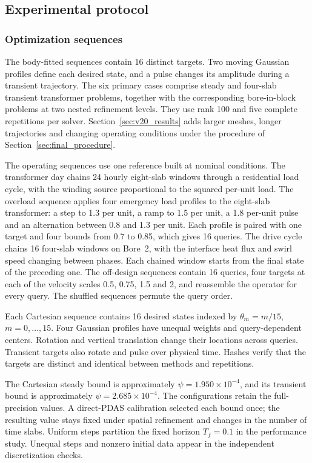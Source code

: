 \subsection{Experimental protocol}
\label{sec:benchmarks}

\subsubsection{Optimization sequences}
The body-fitted sequences contain 16 distinct targets. Two moving
Gaussian profiles define each desired state, and a pulse changes its
amplitude during a transient trajectory.
The six primary cases comprise steady and four-slab transient
transformer problems, together with the corresponding bore-in-block problems at
two nested refinement levels. They use rank 100 and five complete
repetitions per solver. Section~\ref{sec:v20_results} adds larger meshes,
longer trajectories and changing operating conditions under the procedure of
Section~\ref{sec:final_procedure}.

The operating sequences use one reference built at nominal conditions. The
transformer day chains 24 hourly eight-slab windows through a residential load
cycle, with the winding source proportional to the squared per-unit load. The
overload sequence applies four emergency load profiles to the eight-slab transformer: a
step to 1.3 per unit, a ramp to 1.5 per unit, a 1.8 per-unit pulse and an alternation
between 0.8 and 1.3 per unit. Each profile is paired with one target and four bounds
from 0.7 to 0.85, which gives 16 queries. The drive
cycle chains 16 four-slab windows on Bore~2, with the interface heat flux and swirl
speed changing between phases. Each chained window starts from the final state of
the preceding one. The off-design sequences contain 16 queries, four targets at each
of the velocity scales 0.5, 0.75, 1.5 and 2, and reassemble the operator for every
query. The shuffled sequences permute the query order.

Each Cartesian sequence contains 16 desired states indexed by
$\theta_m=m/15$, $m=0,\ldots,15$. Four Gaussian profiles have
unequal weights and query-dependent centers. Rotation and vertical
translation change their locations across queries. Transient targets
also rotate and pulse over physical time. Hashes verify that the targets are
distinct and identical between methods and repetitions.

The Cartesian steady bound is approximately $\psi=1.950\times10^{-4}$,
and its transient bound is approximately $\psi=2.685\times10^{-4}$.
The configurations retain the full-precision values.
A direct-PDAS calibration selected each bound once; the
resulting value stays fixed under spatial refinement and changes in
the number of time slabs. Uniform steps partition the fixed horizon
$T_f=0.1$ in the performance study. Unequal steps and nonzero
initial data appear in the independent discretization checks.

